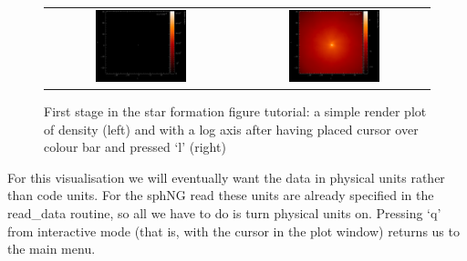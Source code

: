 \documentclass[a4paper,11pt]{article}
\begin{document}
\begin{figure}[h]
\begin{center}
\begin{tabular}{cc}
\includegraphics[width=0.5\textwidth]{starpart1.png} &
\includegraphics[width=0.5\textwidth]{starpart2.png}
\end{tabular}
\caption{First stage in the star formation figure tutorial: a simple render plot of density (left) and with a log axis after having placed cursor over colour bar and pressed `l' (right)}
\label{fig:starpart1}
\end{center}
\end{figure}
For this visualisation we will eventually want the data in physical units rather than code units. For the sphNG read these units are already specified in the read\_data routine, so all we have to do is turn physical units on. Pressing `q' from interactive mode (that is, with the cursor in the plot window) returns us to the main menu.
\end{document}
